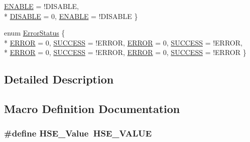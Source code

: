 \begin{DoxyCompactItemize}
\hyperlink{group___l_p_c___types___public___types_ggac9a7e9a35d2513ec15c3b537aaa4fba1a7d46875fa3ebd2c34d2756950eda83bf}{E\+N\+A\+B\+LE} = !\+D\+I\+S\+A\+B\+LE, 
\\*
\hyperlink{group___l_p_c___types___public___types_ggac9a7e9a35d2513ec15c3b537aaa4fba1ad3a9df141be0ccf10389b640f492b26d}{D\+I\+S\+A\+B\+LE} = 0, 
\hyperlink{group___l_p_c___types___public___types_ggac9a7e9a35d2513ec15c3b537aaa4fba1a7d46875fa3ebd2c34d2756950eda83bf}{E\+N\+A\+B\+LE} = !\+D\+I\+S\+A\+B\+LE
 \}
\item 
enum \hyperlink{group___exported__types_ga8333b96c67f83cba354b3407fcbb6ee8}{Error\+Status} \{ \\*
\hyperlink{group___exported__types_ga8333b96c67f83cba354b3407fcbb6ee8a2fd6f336d08340583bd620a7f5694c90}{E\+R\+R\+OR} = 0, 
\hyperlink{group___exported__types_ga8333b96c67f83cba354b3407fcbb6ee8ac7f69f7c9e5aea9b8f54cf02870e2bf8}{S\+U\+C\+C\+E\+SS} = !\+E\+R\+R\+OR, 
\hyperlink{group___exported__types_ga8333b96c67f83cba354b3407fcbb6ee8a2fd6f336d08340583bd620a7f5694c90}{E\+R\+R\+OR} = 0, 
\hyperlink{group___exported__types_ga8333b96c67f83cba354b3407fcbb6ee8ac7f69f7c9e5aea9b8f54cf02870e2bf8}{S\+U\+C\+C\+E\+SS} = !\+E\+R\+R\+OR, 
\\*
\hyperlink{group___exported__types_ga8333b96c67f83cba354b3407fcbb6ee8a2fd6f336d08340583bd620a7f5694c90}{E\+R\+R\+OR} = 0, 
\hyperlink{group___exported__types_ga8333b96c67f83cba354b3407fcbb6ee8ac7f69f7c9e5aea9b8f54cf02870e2bf8}{S\+U\+C\+C\+E\+SS} = !\+E\+R\+R\+OR, 
\hyperlink{group___exported__types_ga8333b96c67f83cba354b3407fcbb6ee8a2fd6f336d08340583bd620a7f5694c90}{E\+R\+R\+OR} = 0, 
\hyperlink{group___exported__types_ga8333b96c67f83cba354b3407fcbb6ee8ac7f69f7c9e5aea9b8f54cf02870e2bf8}{S\+U\+C\+C\+E\+SS} = !\+E\+R\+R\+OR
 \}
\end{DoxyCompactItemize}


\subsection{Detailed Description}


\subsection{Macro Definition Documentation}
\subsubsection[{\texorpdfstring{H\+S\+E\+\_\+\+Value}{HSE_Value}}]{\setlength{\rightskip}{0pt plus 5cm}\#define H\+S\+E\+\_\+\+Value~{\bf H\+S\+E\+\_\+\+V\+A\+L\+UE}}\hypertarget{group___exported__types_gab12a1abe6dd0001e7a0487a8b175b28c}{}\label{group___exported__types_gab12a1abe6dd0001e7a0487a8b175b28c}


